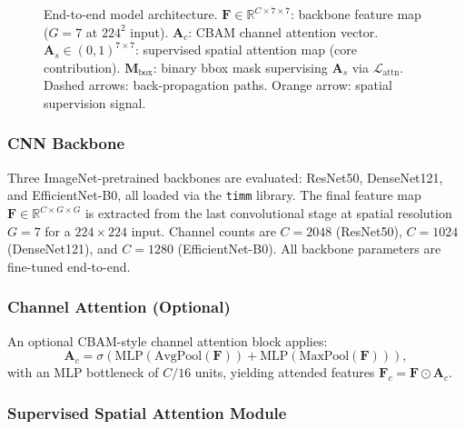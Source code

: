 \documentclass[12pt, a4paper]{article}
\begin{document}
\begin{figure}[H]
  \caption{End-to-end model architecture.
    $\mathbf{F}\!\in\!\mathbb{R}^{C\times7\times7}$: backbone feature map ($G{=}7$ at $224^2$ input).
    $\mathbf{A}_c$: CBAM channel attention vector.
    $\mathbf{A}_s\!\in\!(0,1)^{7\times7}$: supervised spatial attention map (core contribution).
    $\mathbf{M}_{\text{box}}$: binary bbox mask supervising $\mathbf{A}_s$ via $\mathcal{L}_{\text{attn}}$.
    Dashed arrows: back-propagation paths. Orange arrow: spatial supervision signal.}
  \label{fig:arch}
\end{figure}

\subsubsection{CNN Backbone}

Three ImageNet-pretrained backbones are evaluated: ResNet50, DenseNet121, and
EfficientNet-B0, all loaded via the \texttt{timm} library. The final feature map
$\mathbf{F} \in \mathbb{R}^{C \times G \times G}$ is extracted from the last
convolutional stage at spatial resolution $G=7$ for a $224\times224$ input. Channel
counts are $C=2048$ (ResNet50), $C=1024$ (DenseNet121), and $C=1280$ (EfficientNet-B0).
All backbone parameters are fine-tuned end-to-end.

\subsubsection{Channel Attention (Optional)}

An optional CBAM-style channel attention block applies:
\begin{equation}
  \mathbf{A}_c = \sigma\!\left(\text{MLP}(\text{AvgPool}(\mathbf{F})) +
                               \text{MLP}(\text{MaxPool}(\mathbf{F}))\right),
\end{equation}
with an MLP bottleneck of $C/16$ units, yielding attended features
$\mathbf{F}_c = \mathbf{F} \odot \mathbf{A}_c$.

\subsubsection{Supervised Spatial Attention Module}
\end{document}
